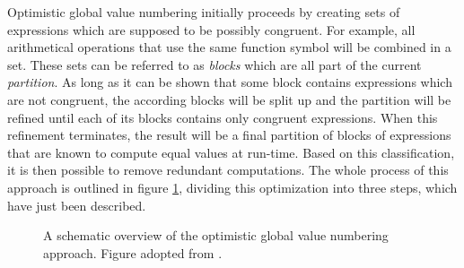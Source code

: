Optimistic global value numbering initially proceeds by creating sets of expressions which are supposed to be possibly congruent. For example, all arithmetical operations that use the same function symbol will be combined in a set. These sets can be referred to as \emph{blocks} which are all part of the current \emph{partition}. As long as it can be shown that some block contains expressions which are not congruent, the according blocks will be split up and the partition will be refined until each of its blocks contains only congruent expressions. When this refinement terminates, the result will be a final partition of blocks of expressions that are known to compute equal values at run-time. Based on this classification, it is then possible to remove redundant computations. The whole process of this approach is outlined in figure \ref{fig:gvn-schema}, dividing this optimization into three steps, which have just been described.

\begin{center}
\begin{minipage}{0.65\textwidth}
\begin{figure}[H]
\centering
{}
\caption{A schematic overview of the optimistic global value numbering approach. Figure adopted from \cite{kongstad:2004:gnu-gvn}.}
\label{fig:gvn-schema}
\end{figure}
\end{minipage}
\end{center}

